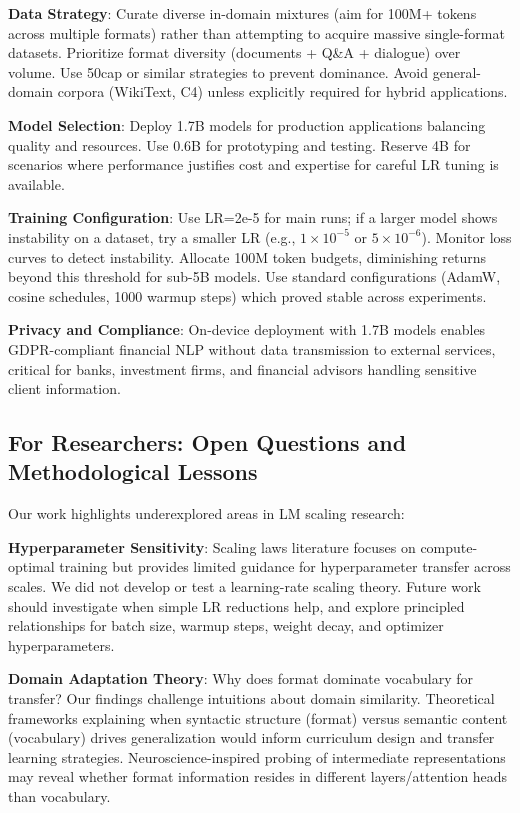 \textbf{Data Strategy}: Curate diverse in-domain mixtures (aim for 100M+ tokens across multiple formats) rather than attempting to acquire massive single-format datasets. Prioritize format diversity (documents + Q\&A + dialogue) over volume. Use 50cap or similar strategies to prevent dominance. Avoid general-domain corpora (WikiText, C4) unless explicitly required for hybrid applications.

\textbf{Model Selection}: Deploy 1.7B models for production applications balancing quality and resources. Use 0.6B for prototyping and testing. Reserve 4B for scenarios where performance justifies cost and expertise for careful LR tuning is available.

\textbf{Training Configuration}: Use LR=2e-5 for main runs; if a larger model shows instability on a dataset, try a smaller LR (e.g., $1\times10^{-5}$ or $5\times10^{-6}$). Monitor loss curves to detect instability. Allocate 100M token budgets, diminishing returns beyond this threshold for sub-5B models. Use standard configurations (AdamW, cosine schedules, 1000 warmup steps) which proved stable across experiments.

\textbf{Privacy and Compliance}: On-device deployment with 1.7B models enables GDPR-compliant financial NLP without data transmission to external services, critical for banks, investment firms, and financial advisors handling sensitive client information.

\subsection{For Researchers: Open Questions and Methodological Lessons}

Our work highlights underexplored areas in LM scaling research:

\textbf{Hyperparameter Sensitivity}: Scaling laws literature \parencite{kaplan2020scaling, hoffmann2022training} focuses on compute-optimal training but provides limited guidance for hyperparameter transfer across scales. We did not develop or test a learning-rate scaling theory. Future work should investigate when simple LR reductions help, and explore principled relationships for batch size, warmup steps, weight decay, and optimizer hyperparameters.

\textbf{Domain Adaptation Theory}: Why does format dominate vocabulary for transfer? Our findings challenge intuitions about domain similarity. Theoretical frameworks explaining when syntactic structure (format) versus semantic content (vocabulary) drives generalization would inform curriculum design and transfer learning strategies. Neuroscience-inspired probing of intermediate representations may reveal whether format information resides in different layers/attention heads than vocabulary.

